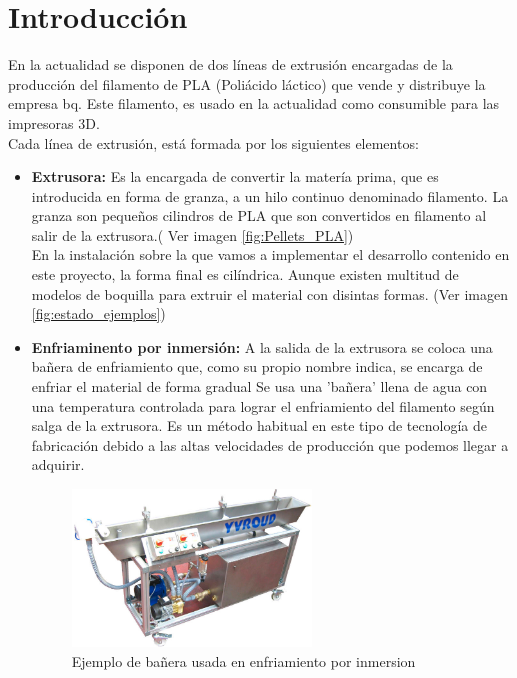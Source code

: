 \chapter{Introducción}
\label{introduccion}

En la actualidad se disponen de dos líneas de extrusión encargadas de la producción del filamento de PLA (Poliácido láctico) que vende y distribuye la empresa bq. Este filamento, es usado en la actualidad como consumible para las impresoras 3D.\\

Cada línea de extrusión, está formada por los siguientes elementos:

\begin{itemize}
    \item \textbf{Extrusora:} Es la encargada de convertir la matería prima, que es introducida en forma de granza, a un hilo continuo denominado filamento. La granza son pequeños cilindros de PLA que son convertidos en filamento al salir de la extrusora.( Ver imagen \ref{fig:Pellets_PLA})\\
    En la instalación sobre la que vamos a implementar el desarrollo contenido en este proyecto, la forma final es cilíndrica. Aunque existen multitud de modelos de boquilla para extruir el material con disintas formas. (Ver imagen \ref{fig:estado_ejemplos})
    \item \textbf{Enfriaminento por inmersión:} 
    A la salida de la extrusora se coloca una bañera de enfriamiento que, como su propio nombre indica, se encarga de enfriar el material de forma gradual
    Se usa una 'bañera' llena de agua con una temperatura controlada para lograr el enfriamiento del filamento según salga de la extrusora.
    Es un método habitual en este tipo de tecnología de fabricación debido a las altas velocidades de producción que podemos llegar a adquirir.
        \begin{figure}[H]
        	\centering
        	\includegraphics[width=0.6\textwidth]{images/enfriamiento.png}
        	\caption{Ejemplo de bañera usada en enfriamiento por inmersion}

\end{figure}
\end{itemize}
